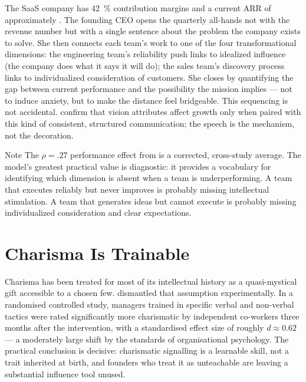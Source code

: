 \begin{example}
The SaaS company has \qty{42}{\percent} contribution margins and a current ARR of approximately
. The founding CEO opens the quarterly all-hands not with the revenue number but
with a single sentence about the problem the company exists to solve. She then connects each
team's work to one of the four transformational dimensions: the engineering team's reliability
push links to idealized influence (the company does what it says it will do); the sales team's
discovery process links to individualized consideration of customers. She closes by quantifying
the gap between current performance and the possibility the mission implies --- not to induce
anxiety, but to make the distance feel bridgeable. This sequencing is not accidental.
\textcite{baum1998longitudinal} confirm that vision attributes affect growth only when paired
with this kind of consistent, structured communication; the speech is the mechanism, not the
decoration.
\end{example}

\begin{admonition}{Note}
The \(\rho = .27\) performance effect from \textcite{judge2004transformational} is a
corrected, cross-study average. The model's greatest practical value is diagnostic: it provides
a vocabulary for identifying which dimension is absent when a team is underperforming. A team
that executes reliably but never improves is probably missing intellectual stimulation. A team
that generates ideas but cannot execute is probably missing individualized consideration and
clear expectations.
\end{admonition}

\section{Charisma Is Trainable}\label{sec:charisma-tactics}

Charisma has been treated for most of its intellectual history as a quasi-mystical gift
accessible to a chosen few. \textcite{antonakis2011charisma} dismantled that assumption
experimentally. In a randomised controlled study, managers trained in specific verbal and
non-verbal tactics were rated significantly more charismatic by independent co-workers three
months after the intervention, with a standardised effect size of roughly
\(d \approx 0.62\) --- a moderately large shift by the standards of organisational psychology.
The practical conclusion is decisive: charismatic signalling is a learnable skill, not a trait
inherited at birth, and founders who treat it as unteachable are leaving a substantial influence
tool unused.

